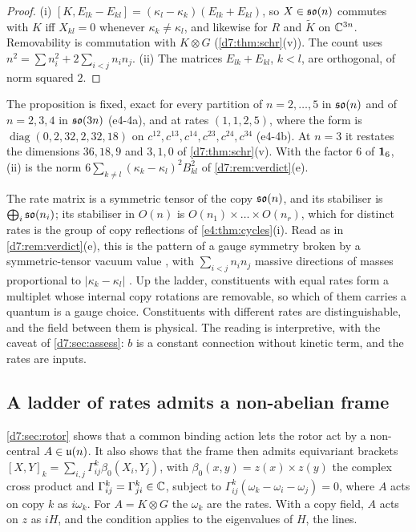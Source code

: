 \begin{proof}
(i) $[K,E_{lk}-E_{kl}]=(\kappa_l-\kappa_k)(E_{lk}+E_{kl})$, so $X\in\mathfrak{so}(n)$ commutes with $K$ iff $X_{kl}=0$ whenever $\kappa_k\neq\kappa_l$, and likewise for $R$ and
$\tilde K$ on $\mathbb{C}^{3n}$. Removability is commutation with $K\otimes G$ (\cref{d7:thm:schr}(v)). The count uses $n^2=\sum n_i^2+2\sum_{i<j}n_in_j$. (ii) The
matrices $E_{lk}+E_{kl}$, $k<l$, are orthogonal, of norm squared $2$.
\end{proof}

The proposition is fixed, exact for every partition of $n=2,\dots,5$ in $\mathfrak{so}(n)$ and of $n=2,3,4$ in $\mathfrak{so}(3n)$ (e4-4a), and at rates $(1,1,2,5)$, where the
form is $\operatorname{diag}(0,2,32,2,32,18)$ on $c^{12},c^{13},c^{14},c^{23},c^{24},c^{34}$ (e4-4b). At $n=3$ it restates the dimensions $36,18,9$ and $3,1,0$ of
\cref{d7:thm:schr}(v). With the factor $6$ of $\mathbf 1_6$, (ii) is the norm $6\sum_{k\neq l}(\kappa_k-\kappa_l)^2B_{kl}^2$ of \cref{d7:rem:verdict}(e).

\begin{remark}
\label{e4:rem:higgs}
The rate matrix is a symmetric tensor of the copy $\mathfrak{so}(n)$, and its stabiliser is $\bigoplus_i\mathfrak{so}(n_i)$; its stabiliser in $O(n)$ is
$O(n_1)\times\dots\times O(n_r)$, which for distinct rates is the group of copy reflections of \cref{e4:thm:cycles}(i). Read as in \cref{d7:rem:verdict}(e), this is the pattern of a gauge symmetry broken by a symmetric-tensor vacuum value \cite{LiLF74}, with $\sum_{i<j}n_in_j$ massive directions
of masses proportional to $|\kappa_k-\kappa_l|$ \cite{EnglertBrout64,Higgs64,Kibble67}. Up the ladder, constituents with equal rates form a multiplet
whose internal copy rotations are removable, so which of them carries a quantum is a gauge choice. Constituents with different rates are
distinguishable, and the field between them is physical. The reading is interpretive, with the caveat of \cref{d7:sec:assess}: $b$ is a constant connection
without kinetic term, and the rates are inputs.
\end{remark}

\subsection{A ladder of rates admits a non-abelian frame}
\label{e4:sec:rotor}

\cref{d7:sec:rotor} shows that a common binding action lets the rotor act by a non-central $A\in\mathfrak{u}(n)$. It also shows that the frame then
admits equivariant brackets $[X,Y]_k=\sum_{i,j}\Gamma^k_{ij}\beta_0(X_i,Y_j)$, with $\beta_0(x,y)=z(x)\times z(y)$ the complex cross product and
$\Gamma^k_{ij}=\Gamma^k_{ji}\in\mathbb{C}$, subject to $\Gamma^k_{ij}(\omega_k-\omega_i-\omega_j)=0$, where $A$ acts on copy $k$ as $i\omega_k$. For $A=K\otimes G$ the
$\omega_k$ are the rates. With a copy field, $A$ acts on $z$ as $iH$, and the condition applies to the eigenvalues of $H$, the lines.

